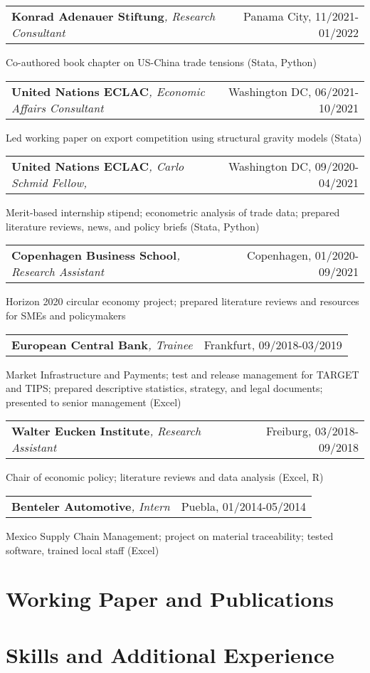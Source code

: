 \documentclass[A4,11pt]{article}
\makeatletter
\newcommand{\Subheading}[4]{   
    \begin{tabular*}{0.97\textwidth}[t]{l@{\extracolsep{\fill}}r}
      \textbf{#1}\textit{\small #2} & \footnotesize #3 
      \end{tabular*}
      \small #4 
    \vspace{7pt}}
\makeatother
\begin{document}
    \Subheading
        {Konrad Adenauer Stiftung}{, Research Consultant}{Panama City, 11/2021-01/2022}
        {Co-authored book chapter on US-China trade tensions (Stata, Python)}  

    \Subheading
        {United Nations ECLAC}{, Economic Affairs Consultant}{Washington DC, 06/2021-10/2021}
        {Led working paper on export competition using structural gravity models (Stata)}

    \Subheading
        {United Nations ECLAC}{, Carlo Schmid Fellow, }{Washington DC, 09/2020-04/2021}
        {Merit-based internship stipend; econometric analysis of trade data; prepared 
        literature reviews, news, and policy briefs (Stata, Python)}

    \Subheading
        {Copenhagen Business School}{, Research Assistant}{Copenhagen, 01/2020-09/2021}
        {Horizon 2020 circular economy project; prepared literature reviews and 
        resources for SMEs and policymakers}

    \Subheading
        {European Central Bank}{, Trainee}{Frankfurt, 09/2018-03/2019}
        {Market Infrastructure and Payments; test and release management for TARGET 
        and TIPS; prepared descriptive statistics, strategy, and legal documents;
        presented to senior management (Excel)}

    \Subheading
        {Walter Eucken Institute}{, Research Assistant}{Freiburg, 03/2018-09/2018}
        {Chair of economic policy; literature reviews and data analysis (Excel, R)}

    \Subheading
        {Benteler Automotive}{, Intern}{Puebla, 01/2014-05/2014}
        {Mexico Supply Chain Management; project on material traceability; tested software, 
        trained local staff (Excel)}

\newpage

\section{Working Paper and Publications}
\setlength{}
\begin{refsection}
\nocite{*}
\printbibliography[heading=none]
\end{refsection}

\section{Skills and Additional Experience}
\end{document}
